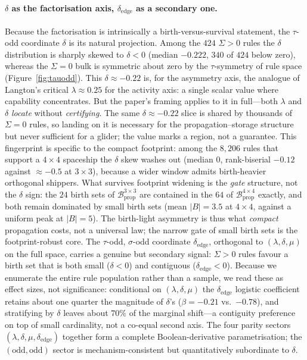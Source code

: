 \documentclass{article}
\begin{document}
\paragraph{$\delta$ as the factorisation axis, $\delta_{\text{edge}}$ as a secondary one.}
Because the factorisation is intrinsically a birth-versus-survival statement, the
$\tau$-odd coordinate $\delta$ is its natural projection. Among the $424$
$\Sigma>0$ rules the $\delta$ distribution is sharply skewed to $\delta<0$ (median
$-0.222$, $340$ of $424$ below zero), whereas the $\Sigma=0$ bulk is symmetric
about zero by the $\tau$-symmetry of rule space (Figure~\ref{fig:tauodd}). This
$\delta\approx-0.22$ is, for the asymmetry axis, the analogue of Langton's
critical $\lambda\approx0.25$ for the activity axis: a single scalar value where
capability concentrates. But the paper's framing applies to it in full---both
$\lambda$ and $\delta$ \emph{locate} without \emph{certifying}. The same
$\delta\approx-0.22$ slice is shared by thousands of $\Sigma=0$ rules, so landing
on it is necessary for the propagation--storage structure but never sufficient for
a glider; the value marks a region, not a guarantee. This fingerprint is specific
to the compact footprint: among the $8{,}206$ rules that support a $4{\times}4$
spaceship the $\delta$ skew washes out (median $0$, rank-biserial $-0.12$ against
$\approx-0.5$ at $3{\times}3$), because a wider window admits birth-heavier
orthogonal shippers. What survives footprint widening is the \emph{gate}
structure, not the $\delta$ sign: the $24$ birth sets of
$\mathcal{B}_{\text{prop}}^{3\times3}$ are contained in the $64$ of
$\mathcal{B}_{\text{prop}}^{4\times4}$ exactly, and both remain dominated by small
birth sets (mean $|B|=3.5$ at $4{\times}4$, against a uniform peak at $|B|=5$). The
birth-light asymmetry is thus what \emph{compact} propagation costs, not a
universal law; the narrow gate of small birth sets is the footprint-robust core.
The
$\tau$-odd, $\sigma$-odd coordinate $\delta_{\text{edge}}$, orthogonal to
$(\lambda,\delta,\mu)$ on the full space, carries a genuine but secondary signal:
$\Sigma>0$ rules favour a birth set that is both small ($\delta<0$) and contiguous
($\delta_{\text{edge}}<0$). Because we enumerate the entire rule population rather
than a sample, we read these as effect sizes, not significance: conditional on
$(\lambda,\delta,\mu)$ the $\delta_{\text{edge}}$ logistic coefficient retains
about one quarter the magnitude of $\delta$'s ($\beta=-0.21$ vs.\ $-0.78$), and
stratifying by $\delta$ leaves about
$70\%$ of the marginal shift---a contiguity preference on top of small cardinality,
not a co-equal second axis. The four parity sectors
$(\lambda,\delta,\mu,\delta_{\text{edge}})$ together form a complete
Boolean-derivative parametrisation; the $(\text{odd},\text{odd})$ sector is
mechanism-consistent but quantitatively subordinate to $\delta$.
\end{document}
